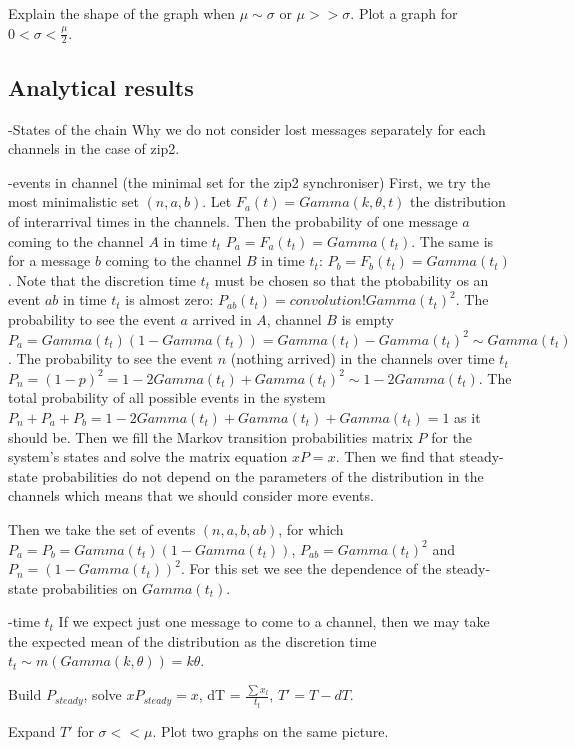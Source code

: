 Explain the shape of the graph when $\mu \sim \sigma$ or $\mu >> \sigma$.
Plot a graph for $0 < \sigma < \frac{\mu}{2}$.

  \subsection{Analytical results}
-States of the chain
Why we do not consider lost messages separately for each channels in the case of zip2. 

-events in channel (the minimal set for the zip2 synchroniser)
First, we try the most minimalistic set $(n,a,b)$. Let $F_{a}(t) = Gamma(k, \theta, t)$ the distribution of interarrival times in the channels. Then the probability of one message $a$ coming to the channel $A$ in time $t_{t}$ $P_{a} = F_{a}(t_{t}) = Gamma(t_{t})$. The same is for a message $b$ coming to the channel $B$ in time $t_{t}$: $P_{b} = F_{b}(t_{t}) = Gamma(t_{t})$. Note that the discretion time $t_{t}$ must be chosen so that the ptobability os an event $ab$ in time $t_{t}$ is almost zero: $P_{ab}(t_{t}) = convolution! Gamma(t_{t})^2$. The probability to see the event $a$ arrived in $A$, channel $B$ is empty $P_{a} = Gamma(t_{t})(1-Gamma(t_{t})) = Gamma(t_{t}) - Gamma(t_{t})^2 \sim Gamma(t_{t})$. The probability to see the event $n$ (nothing arrived) in the channels over time $t_{t}$ $P_{n} = (1-p)^2 = 1 - 2 Gamma(t_{t}) + Gamma(t_{t})^2 \sim 1 - 2 Gamma(t_{t})$. The total probability of all possible events in the system $P_{n} + P_{a} + P_{b} = 1 - 2 Gamma(t_{t}) + Gamma(t_{t}) + Gamma(t_{t}) = 1$ as it should be. Then we fill the Markov transition probabilities matrix $P$ for the system's states and solve the matrix equation $xP = x$. Then we find that steady-state probabilities do not depend on the parameters of the distribution in the channels which means that we should consider more events.

Then we take the set of events $(n,a,b,ab)$, for which $P_{a} = P_{b} = Gamma(t_{t})(1 - Gamma(t_{t}))$, $P_{ab} = Gamma(t_{t})^2$ and $P_{n} = (1 - Gamma(t_{t}))^2$. For this set we see the dependence of the steady-state probabilities on $Gamma(t_{t})$.

-time $t_t$
If we expect just one message to come to a channel, then we may take the expected mean of the distribution as the discretion time $t_{t} \sim m(Gamma(k,\theta)) = k \theta$.


Build $P_{steady}$, solve $x P_{steady} = x$, dT = $\frac{\sum{x_l}}{t_t}$, $T' = T - dT$.

Expand $T'$ for $\sigma << \mu$. Plot two graphs on the same picture.
